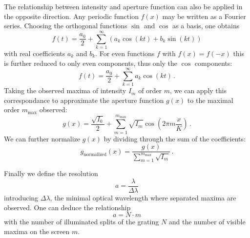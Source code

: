 The relationship between intensity and aperture function can also be applied in the 
opposite direction. Any periodic function $f(x)$ may be written as a Fourier series. 
Choosing the orthogonal functions $\sin$ and $\cos$ as a basis, one obtains 
\begin{equation}
    f(t)=\frac{a_{0}}{2}+\sum_{k=1}^{\infty}\left(a_{k}\cos\left(kt\right)+b_{k}\sin\left(kt\right)\right)
    \label{eq:fourier_series}
\end{equation}
with real coefficients $a_k$ and $b_k$. For even functions $f$ with $f(x) = f(-x)$ 
this is further reduced to only even components, thus only the $\cos$ components:
\begin{equation}
    f(t)=\frac{a_{0}}{2}+\sum_{k=1}^{\infty} a_{k}\cos\left(kt\right)\, .
    \label{eq:fourier_series_even}
\end{equation}
Taking the observed maxima of intensity $I_m$ of order $m$, we can 
apply this correspondance to approximate the aperture function $g(x)$ 
to the maximal order $m_\mathrm{max}$ observed:
\begin{equation}
    g(x)=\frac{\sqrt{I_{0}}}{2}+\sum_{m=1}^{m_\mathrm{max}} \sqrt{I_m}\cos\left(2 \pi m \frac{x}{K}\right)\, .
    \label{eq:g_approx}
\end{equation}
We can further normalize $g(x)$ by dividing through the sum of the coefficients:
\begin{equation}
    g_\mathrm{normalized}(x)=\frac{g(x)}{\sum_{m=1}^{m_\mathrm{max}} \sqrt{I_m}}\, .
    \label{eq:g_approx}
\end{equation}


Finally we define the resolution
\begin{equation}
    a = \frac{\lambda}{\Delta \lambda}
\end{equation}
introducing $\Delta \lambda$, the minimal optical wavelength where separated maxima 
are observed. One can deduce the relationship
\begin{equation}
    a = N \cdot m
    \label{eq:resolution}
\end{equation}
with the number of illuminated splits of the grating $N$ and the number of 
visible maxima on the screen $m$.\cite{ver}
\clearpage

